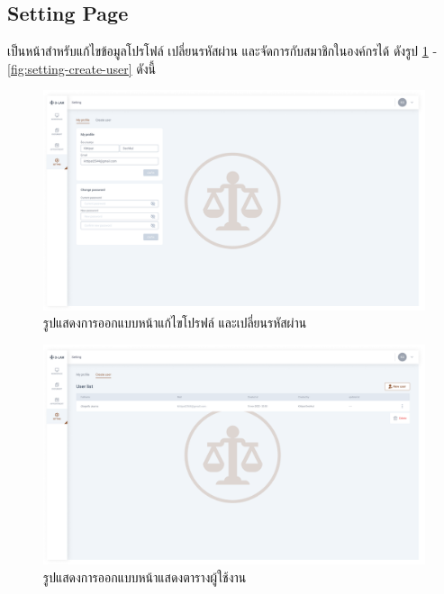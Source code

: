 \documentclass[12pt,oneside,openright,a4paper]{cpe-thai-project}
\begin{document}
\clearpage

\newpage
\subsection{Setting Page}
\hspace*{1cm} เป็นหน้าสำหรับแก้ไขข้อมูลโปรโฟล์ เปลี่ยนรหัสผ่าน และจัดการกับสมาชิกในองค์กรได้ ดังรูป \ref{fig:setting-myprofile} - \ref{fig:setting-create-user} ดังนี้

\begin{figure}[!h]\centering
  \includegraphics[width=13cm]{./assets/userinterface/setting-myprofile.png}
  \caption{รูปแสดงการออกแบบหน้าแก้ไขโปรฟล์ และเปลี่ยนรหัสผ่าน }\label{fig:setting-myprofile}
\end{figure}

\begin{figure}[!h]\centering
  \includegraphics[width=13cm]{./assets/userinterface/setting-manage-user.png}
  \caption{รูปแสดงการออกแบบหน้าแสดงตารางผู้ใช้งาน}\label{fig:setting-manage-user}
\end{figure}
\end{document}
